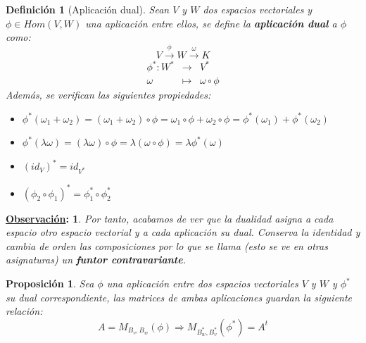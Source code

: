 \documentclass[10pt,a4paper,openright]{book}
\theoremstyle{break}
\newtheorem*{defi}{Definición}
\newtheorem*{prop}{Proposición}
\newtheorem*{obs}{\underline{Observación}:}
\begin{document}
\begin{defi}[Aplicación dual]
Sean $V$ y $W$ dos espacios vectoriales y $\phi \in Hom(V,W)$ una aplicación entre ellos, se define la \textbf{aplicación dual} a $\phi$ como:
$$V\xrightarrow{\phi} W\xrightarrow{\omega} K$$
\begin{eqnarray*}
\phi^*: W^* &\longrightarrow& V^* \\ \omega &\longmapsto& \omega\circ \phi 
\end{eqnarray*}
Además, se verifican las siguientes propiedades:
\begin{itemize}
\item $\phi^*(\omega_1+\omega_2)=(\omega_1+\omega_2)\circ \phi= \omega_1\circ \phi+\omega_2 \circ \phi= \phi^*(\omega_1)+\phi^*(\omega_2)$
\item $\phi^*(\lambda\omega)=(\lambda\omega)\circ \phi=\lambda(\omega\circ\phi)=\lambda \phi^*(\omega)$
\item $(id_V)^*=id_{V^*}$
\item $(\phi_2\circ\phi_1)^*=\phi_1^*\circ \phi_2^*$
\end{itemize}
\end{defi}

\begin{obs}
Por tanto, acabamos de ver que la dualidad asigna a cada espacio otro espacio vectorial y a cada aplicación su dual. Conserva la identidad y cambia de orden las composiciones por lo que se llama (esto se ve en otras asignaturas) un \textbf{funtor contravariante}.
\end{obs}

\begin{prop}
Sea $\phi$ una aplicación entre dos espacios vectoriales $V$ y $W$ y $\phi^*$ su dual correspondiente, las matrices de ambas aplicaciones guardan la siguiente relación:
$$A=M_{B_v, B_w}(\phi)\Rightarrow M_{B_w^*, B_v^*}(\phi^*)=A^t$$
\end{prop}
\end{document}
